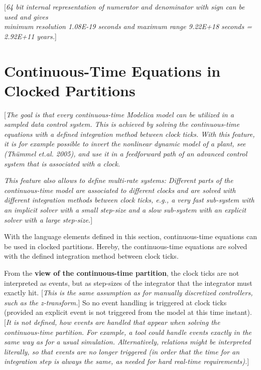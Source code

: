 {[}\emph{64 bit internal representation of numerator and denominator
with sign can be used and gives\\
minimum resolution 1.08E-19 seconds and maximum range 9.22E+18 seconds =
2.92E+11 years.}{]}

\section{Continuous-Time Equations in Clocked Partitions}

{[}\emph{The goal is that every continuous-time Modelica model can be
utilized in a sampled data control system. This is achieved by solving
the continuous-time equations with a defined integration method between
clock ticks. With this feature, it is for example possible to invert the
nonlinear dynamic model of a plant, see (Thümmel et.al. 2005), and use
it in a feedforward path of an advanced control system that is
associated with a clock.}

\emph{This feature also allows to define multi-rate systems: Different
parts of the continuous-time model are associated to different clocks
and are solved with different integration methods between clock ticks,
e.g., a very fast sub-system with an implicit solver with a small
step-size and a slow sub-system with an explicit solver with a large
step-size.}{]}

With the language elements defined in this section, continuous-time
equations can be used in clocked partitions. Hereby, the continuous-time
equations are solved with the defined integration method between clock
ticks.

From the \textbf{view of the continuous-time partition}, the clock ticks
are not interpreted as events, but as step-sizes of the integrator that
the integrator must exactly hit. {[}\emph{This is the same assumption as
for manually discretized controllers, such as the z-transform.}{]} So no
event handling is triggered at clock ticks (provided an explicit event
is not triggered from the model at this time instant). {[}\emph{It is
not defined, how events are handled that appear when solving the
continuous-time partition. For example, a tool could handle events
exactly in the same way as for a usual simulation. Alternatively,
relations might be interpreted literally, so that events are no longer
triggered (in order that the time for an integration step is always the
same, as needed for hard real-time requirements).}{]}

